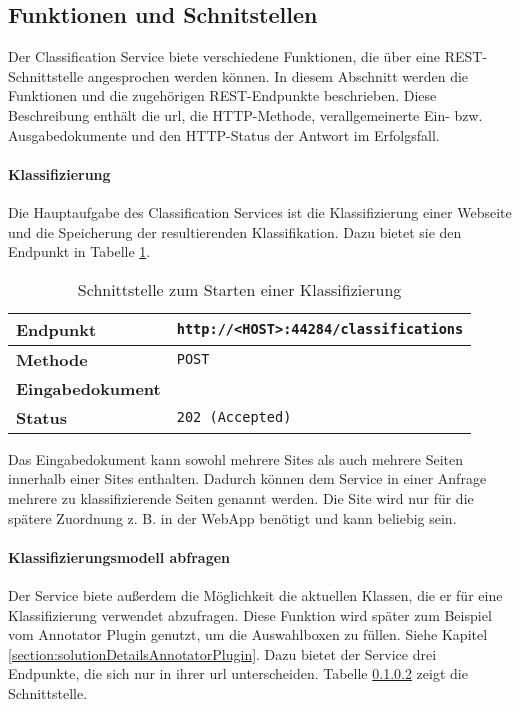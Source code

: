 \subsection{Funktionen und Schnitstellen}
    Der Classification Service biete verschiedene Funktionen,
    die über eine REST-Schnittstelle angesprochen werden können.
    In diesem Abschnitt werden die Funktionen und die zugehörigen
    REST-Endpunkte beschrieben.
    Diese Beschreibung enthält die \gls{url}, die HTTP-Methode,
    verallgemeinerte Ein- bzw. Ausgabedokumente und den HTTP-Status
    der Antwort im Erfolgsfall.

    \paragraph{Klassifizierung}
    Die Hauptaufgabe des Classification Services ist die Klassifizierung einer Webseite
    und die Speicherung der resultierenden Klassifikation.
    Dazu bietet sie den Endpunkt in Tabelle \ref{table:startClassificationInterface}.

    \begin{table}[htb]
        \centering
        \begin{tabular}{|l|l|}
        \hline
        \textbf{Endpunkt} & \texttt{http://<HOST>:44284/classifications}\\
        \hline
        \textbf{Methode} & \texttt{POST}\\
        \hline
        \textbf{Eingabedokument} & \\
        \hline
        \textbf{Status} & \texttt{202 (Accepted)}\\
        \hline
        \end{tabular}
        \caption{Schnittstelle zum Starten einer Klassifizierung}
        \label{table:startClassificationInterface}
    \end{table}

    Das Eingabedokument kann sowohl mehrere Sites als auch mehrere Seiten innerhalb einer Sites enthalten.
    Dadurch können dem Service in einer Anfrage mehrere zu klassifizierende Seiten genannt werden.
    Die Site wird nur für die spätere Zuordnung z. B. in der WebApp benötigt und kann beliebig sein.

    \paragraph{Klassifizierungsmodell abfragen}
    Der Service biete außerdem die Möglichkeit die aktuellen Klassen,
    die er für eine Klassifizierung verwendet abzufragen.
    Diese Funktion wird später zum Beispiel vom Annotator Plugin genutzt,
    um die Auswahlboxen zu füllen. Siehe Kapitel \ref{section:solutionDetailsAnnotatorPlugin}.
    Dazu bietet der Service drei Endpunkte, die sich nur in ihrer \gls{url} unterscheiden.
    Tabelle \ref{} zeigt die Schnittstelle.

